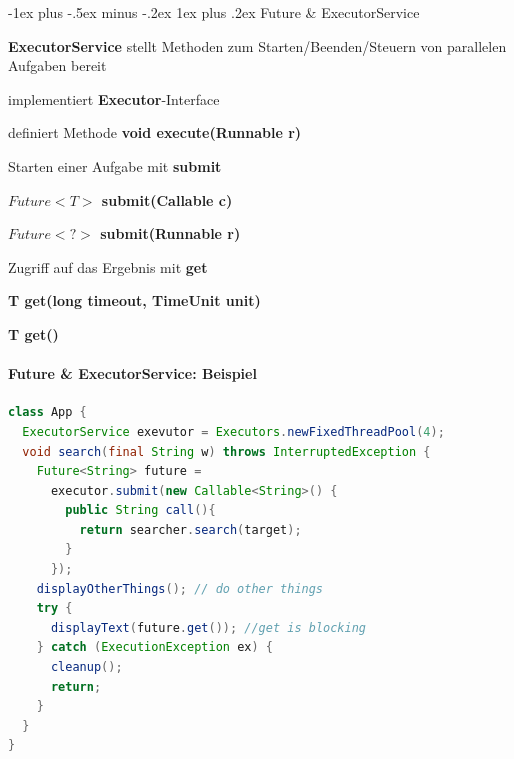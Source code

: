 \documentclass[10pt]{article}
\makeatletter
\renewcommand{\subsubsection}{\@startsection{subsubsection}{3}{0mm}%
                                {-1ex plus -.5ex minus -.2ex}%
                                {1ex plus .2ex}%
                                {\normalfont\small\bfseries}}
\makeatother
\begin{document}
  \subsubsection{Future \& ExecutorService}
  \begin{itemize*}
    \item \textbf{ExecutorService} stellt Methoden zum Starten/Beenden/Steuern von parallelen Aufgaben bereit
    \item implementiert \textbf{Executor}-Interface
    \begin{itemize*}
      \item definiert Methode \textbf{void execute(Runnable r)}
    \end{itemize*}
    \item Starten einer Aufgabe mit \textbf{submit}
    \begin{itemize*}
      \item \textbf{$Future<T>$ submit(Callable c)}
      \item \textbf{$Future<?>$ submit(Runnable r)}
    \end{itemize*}
    \item Zugriff auf das Ergebnis mit \textbf{get}
    \begin{itemize*}
      \item \textbf{T get(long timeout, TimeUnit unit)}
      \item \textbf{T get()}
    \end{itemize*}
  \end{itemize*}
  
  \paragraph{Future \& ExecutorService: Beispiel}
  \begin{lstlisting}[language=java]
class App {
  ExecutorService exevutor = Executors.newFixedThreadPool(4);
  void search(final String w) throws InterruptedException {
    Future<String> future = 
      executor.submit(new Callable<String>() {
        public String call(){
          return searcher.search(target);
        }
      });
    displayOtherThings(); // do other things
    try {
      displayText(future.get()); //get is blocking
    } catch (ExecutionException ex) {
      cleanup();
      return;
    }
  }
}
\end{lstlisting}
  
\end{document}
